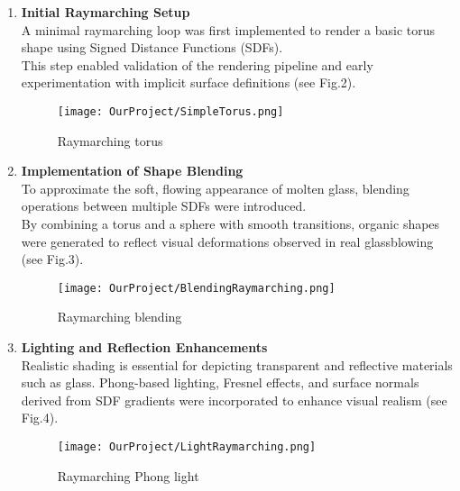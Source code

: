 \documentclass{rapportcs}
\begin{document}
        \begin{enumerate}
        
          \item \textbf{Initial Raymarching Setup}\\
            A minimal raymarching loop was first implemented to render a basic torus shape using Signed Distance Functions (SDFs). \\
            This step enabled validation of the rendering pipeline and early experimentation with implicit surface definitions (see Fig.2).
        
            \begin{figure}[H]
                \centering
                \texttt{[image: OurProject/SimpleTorus.png]}
                \caption{Raymarching torus}
                \label{fig:label_image}
            \end{figure}
            \newpage
            
          \item \textbf{Implementation of Shape Blending}\\
            To approximate the soft, flowing appearance of molten glass, blending operations between multiple SDFs were introduced. \\
            By combining a torus and a sphere with smooth transitions, organic shapes were generated to reflect visual deformations observed in real glassblowing (see Fig.3).
        
            \begin{figure}[H]
                \centering
                \texttt{[image: OurProject/BlendingRaymarching.png]}
                \caption{Raymarching blending}
                \label{fig:label_image}
            \end{figure}
        
          \newpage
            
          \item \textbf{Lighting and Reflection Enhancements}\\
            Realistic shading is essential for depicting transparent and reflective materials such as glass.
            Phong-based lighting, Fresnel effects, and surface normals derived from SDF gradients were incorporated to enhance visual realism (see Fig.4).\\
        
            \begin{figure}[H]
                \centering
                \texttt{[image: OurProject/LightRaymarching.png]}
                \caption{Raymarching Phong light}
                \label{fig:label_image}
            \end{figure}
        

\end{enumerate}
\end{document}
